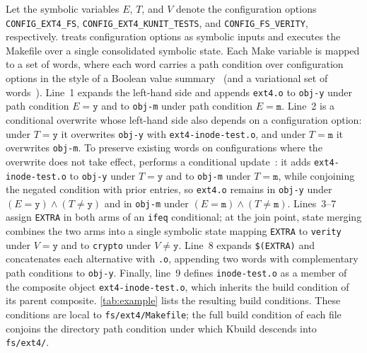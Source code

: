 \documentclass[acmsmall,screen,review,anonymous,nonacm]{acmart}
\begin{document}
  Let the symbolic variables $E$, $T$, and $V$ denote the configuration options \texttt{CONFIG\_EXT4\_FS}, \texttt{CONFIG\_\allowbreak EXT4\_\allowbreak KUNIT\_\allowbreak TESTS}, and \texttt{CONFIG\_FS\_VERITY}, respectively.
  \tool{} treats configuration options as symbolic inputs and executes the Makefile over a single consolidated symbolic state.
  Each Make variable is mapped to a set of words, where each word carries a path condition over configuration options in the style of a Boolean value summary~\cite{sen2015multise} (and a variational set of words~\cite{walkingshaw2014variational}).
  Line~1 expands the left-hand side and appends \texttt{ext4.o} to \texttt{obj-y} under path condition $E = \mathtt{y}$ and to \texttt{obj-m} under path condition $E = \mathtt{m}$.
  Line~2 is a conditional overwrite whose left-hand side also depends on a configuration option: under $T = \mathtt{y}$ it overwrites \texttt{obj-y} with \texttt{ext4-inode-test.o}, and under $T = \mathtt{m}$ it overwrites \texttt{obj-m}.
  To preserve existing words on configurations where the overwrite does not take effect, \tool{} performs a conditional update~\cite{sen2015multise,gazzillo2017kmax}: it adds \texttt{ext4-inode-test.o} to \texttt{obj-y} under $T = \mathtt{y}$ and to \texttt{obj-m} under $T = \mathtt{m}$, while conjoining the negated condition with prior entries, so \texttt{ext4.o} remains in \texttt{obj-y} under $(E = \mathtt{y}) \land (T \ne \mathtt{y})$ and in \texttt{obj-m} under $(E = \mathtt{m}) \land (T \ne \mathtt{m})$.
  Lines~3--7 assign \texttt{EXTRA} in both arms of an \texttt{ifeq} conditional; at the join point, state merging combines the two arms into a single symbolic state mapping \texttt{EXTRA} to \texttt{verity} under $V = \mathtt{y}$ and to \texttt{crypto} under $V \ne \mathtt{y}$.
  Line~8 expands \texttt{\$(EXTRA)} and concatenates each alternative with \texttt{.o}, appending two words with complementary path conditions to \texttt{obj-y}.
  Finally, line~9 defines \texttt{inode-test.o} as a member of the composite object \texttt{ext4-inode-test.o}, which inherits the build condition of its parent composite.
  \autoref{tab:example} lists the resulting build conditions.
  These conditions are local to \texttt{fs/ext4/Makefile}; the full build condition of each file conjoins the directory path condition under which Kbuild descends into \texttt{fs/ext4/}.
\end{document}
